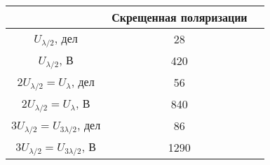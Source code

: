 \begin{tabular}{|c|c|c|}
\hline
&Скрещенная поляризации \\
\hline
$U_{\lambda/2}$, дел& 28 \\
\hline
$U_{\lambda/2}$, В& 420 \\
\hline
\hline
$2U_{\lambda/2} = U_\lambda$, дел& 56 \\
\hline
$2U_{\lambda/2} = U_\lambda$, В& 840 \\
\hline
\hline
$3U_{\lambda/2} = U_{3\lambda/2}$, дел& 86 \\
\hline
$3U_{\lambda/2} = U_{3\lambda/2}$, В& 1290\\
\hline
\end{tabular}